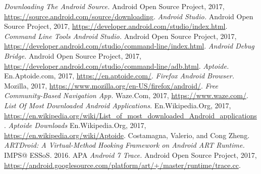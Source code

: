 \begin{thebibliography}{1}
 {\em Downloading The Android Source.} Android Open Source Project, 2017, \url{https://source.android.com/source/downloading}.  
 {\em Android Studio.} Android Open Source Project, 2017, \url{https://developer.android.com/studio/index.html}.
 {\em Command Line Tools Android Studio.} Android Open Source Project, 2017, \url{https://developer.android.com/studio/command-line/index.html}.
 {\em Android Debug Bridge.} Android Open Source Project, 2017, \url{https://developer.android.com/studio/command-line/adb.html}.
 {\em Aptoide.} En.Aptoide.com, 2017, \url{https://en.aptoide.com/}.
 {\em Firefox Android Browser.} Mozilla, 2017, \url{https://www.mozilla.org/en-US/firefox/android/}.
 {\em Free Community-Based Navigation App.} Waze.Com, 2017, \url{https://www.waze.com/}.
 {\em List Of Most Downloaded Android Applications.} En.Wikipedia.Org, 2017, \url{https://en.wikipedia.org/wiki/List_of_most_downloaded_Android_applications}.
 {\em Aptoide Downloads} En.Wikipedia.Org, 2017, \url{https://en.wikipedia.org/wiki/Aptoide}.
 Costamagna, Valerio, and Cong Zheng. {\em ARTDroid: A Virtual-Method Hooking Framework on Android ART Runtime.} IMPS@ ESSoS. 2016. APA
 {\em Android 7 Trace.} Android Open Source Project, 2017, \url{https://android.googlesource.com/platform/art/+/master/runtime/trace.cc}.
\end{thebibliography}

